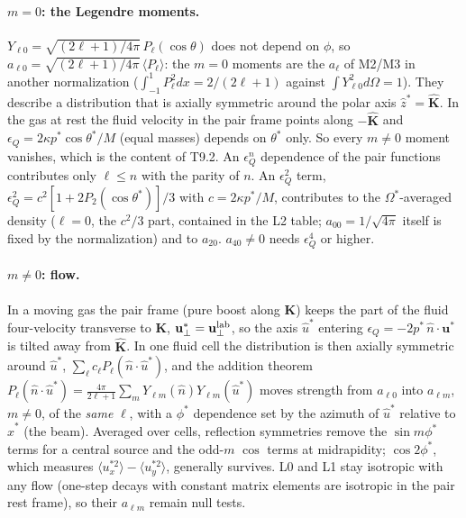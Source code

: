 \documentclass[11pt,a4paper]{article}
\begin{document}
\paragraph{$m=0$: the Legendre moments.} $Y_{\ell0}=\sqrt{(2\ell+1)/4\pi}\,P_\ell(\cos\theta)$ does not
depend on $\phi$, so $a_{\ell0}=\sqrt{(2\ell+1)/4\pi}\,\langle P_\ell\rangle$: the $m=0$ moments are the
$a_\ell$ of M2/M3 in another normalization ($\int_{-1}^1P_\ell^2dx=2/(2\ell+1)$ against
$\int Y_{\ell0}^2d\Omega=1$). They describe a distribution that is axially symmetric around the polar
axis $\hat z^*=\hat{\mathbf K}$. In the gas at rest the fluid velocity in the pair frame points along
$-\hat{\mathbf K}$ and $\epsilon_Q=2\kappa p^*\cos\theta^*/M$ (equal masses) depends on $\theta^*$ only.
So every $m\neq0$ moment vanishes, which is the content of T9.2. An $\epsilon_Q^n$ dependence of the pair
functions contributes only $\ell\le n$ with the parity of $n$. An $\epsilon_Q^2$ term,
$\epsilon_Q^2=c^2[1+2P_2(\cos\theta^*)]/3$ with $c=2\kappa p^*/M$, contributes to the $\Omega^*$-averaged density
($\ell=0$, the $c^2/3$ part, contained in the L2 table; $a_{00}=1/\sqrt{4\pi}$ itself is fixed by the
normalization) and to $a_{20}$. $a_{40}\neq0$ needs $\epsilon_Q^4$ or higher.

\paragraph{$m\neq0$: flow.} In a moving gas the pair frame (pure boost along $\mathbf K$) keeps the
part of the fluid four-velocity transverse to $\mathbf K$, $\mathbf u^*_\perp=\mathbf u_{\perp}^{\rm lab}$, so the
axis $\hat u^*$ entering $\epsilon_Q=-2p^*\,\hat n\cdot\mathbf u^*$ is tilted away from $\hat{\mathbf K}$.
In one fluid cell the distribution is then axially symmetric around $\hat u^*$,
$\sum_\ell c_\ell P_\ell(\hat n\cdot\hat u^*)$, and the addition theorem
$P_\ell(\hat n\cdot\hat u^*)=\frac{4\pi}{2\ell+1}\sum_mY_{\ell m}(\hat n)Y_{\ell m}(\hat u^*)$
moves strength from $a_{\ell0}$ into $a_{\ell m}$, $m\neq0$, of the \emph{same} $\ell$, with a $\phi^*$
dependence set by the azimuth of $\hat u^*$ relative to $\hat x^*$ (the beam). Averaged over cells,
reflection symmetries remove the $\sin m\phi^*$ terms for a central source and the odd-$m$ $\cos$ terms at
midrapidity; $\cos2\phi^*$, which measures $\langle u^{*2}_x\rangle-\langle u^{*2}_y\rangle$, generally
survives. L0 and L1 stay isotropic with any flow (one-step decays with constant matrix elements are
isotropic in the pair rest frame), so their $a_{\ell m}$ remain null tests.
\end{document}
